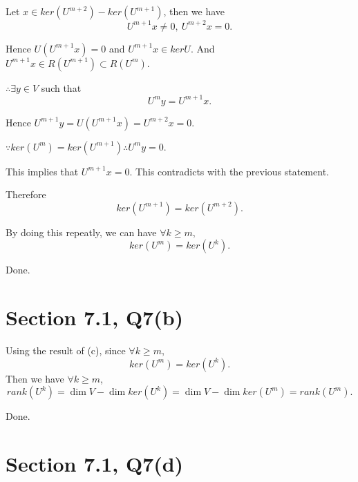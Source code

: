 \documentclass[12pt]{article}%
\begin{document}
Let $x \in ker(U^{m+2}) - ker(U^{m+1})$, then we have $$U^{m+1}x \neq 0,~ U^{m+2}x =0.$$

Hence $U(U^{m+1}x)=0$ and $U^{m+1}x \in ker U$. And $U^{m+1}x \in R(U^{m+1}) \subset R(U^{m}).$

$\therefore \exists y \in V$ such that $$U^{m}y=U^{m+1}x.$$

Hence $U^{m+1}y=U(U^{m+1}x)=U^{m+2}x=0.$

$\because ker(U^m)=ker(U^{m+1})  \therefore U^m y=0.$

This implies that $ U^{m+1}x=0. $ This contradicts with the previous statement.

Therefore $$ker(U^{m+1})=ker(U^{m+2}).$$

By doing this repeatly, we can have $\forall k\geq m,$ $$ker(U^m)=ker(U^k).$$

Done.

\section{Section 7.1, Q7(b)}

Using the result of (c), since $\forall k\geq m,$ $$ker(U^m)=ker(U^k).$$ Then we have $\forall k\geq m$, 
$$rank(U^k)=\dim V - \dim ker(U^k) = \dim V - \dim ker(U^m)=rank(U^m).$$

Done.

\section{Section 7.1, Q7(d)}
\end{document}
